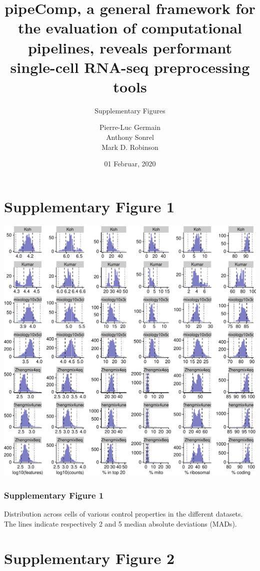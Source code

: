 \documentclass[]{article}
\title{\Large{pipeComp, a general framework for the evaluation of computational pipelines, reveals performant single-cell RNA-seq preprocessing tools}}
\subtitle{\vspace{0.5cm}\LARGE{Supplementary Figures}\vspace{0.5cm}}
\author{Pierre-Luc Germain \\ Anthony Sonrel \\ Mark D. Robinson}
\date{01 Februar, 2020}
\begin{document}
\maketitle

{
\setcounter{tocdepth}{2}
\tableofcontents
}
\renewcommand{\thepage}{S\arabic{page}}

\newpage

\hypertarget{supplementary-figure-1}{%
\section{Supplementary Figure 1}\label{supplementary-figure-1}}

\includegraphics{supp_figures_files/figure-latex/dist_cell_properties-1.pdf}

\hypertarget{supplementary-figure-1-1}{%
\subsubsection{Supplementary Figure 1}\label{supplementary-figure-1-1}}

Distribution across cells of various control properties in the different
datasets. The lines indicate respectively 2 and 5 median absolute
deviations (MADs).

\newpage

\hypertarget{supplementary-figure-2}{%
\section{Supplementary Figure 2}\label{supplementary-figure-2}}
\end{document}
